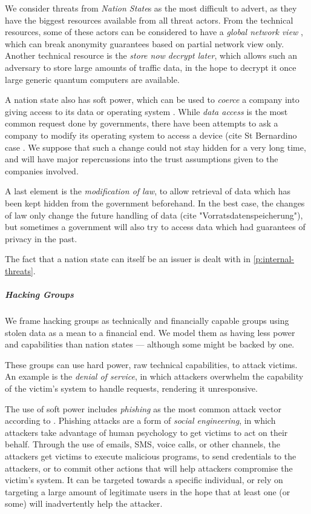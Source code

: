 We consider threats from \emph{Nation State}s as the most difficult to advert, as they have
the biggest resources available from all threat actors.
From the technical resources, some of these actors can be considered to have a \emph{global network view}
\cite{TorAttack}, which can break anonymity guarantees based on partial network view only.
Another technical resource is the \emph{store now decrypt later}, which allows such an adversary
to store large amounts of traffic data, in the hope to decrypt it once large generic quantum computers
are available.

A nation state also has soft power, which can be used to \emph{coerce} a company into giving
access to its data or operating system \cite{TelegramArrest}\cite{ProtonLogging}.
While \emph{data access} is the most common request done by governments, there have been attempts
to ask a company to modify its operating system to access a device (cite St Bernardino case
\cite{AppleSanBernardino}.
We suppose that such a change could not stay hidden for a very long time, and will have major
repercussions into the trust assumptions given to the companies involved.

A last element is the \emph{modification of law}, to allow retrieval of data which has been
kept hidden from the government beforehand.
In the best case, the changes of law only change the future handling of data (cite
"Vorratsdatenspeicherung"), but sometimes a government will also try to access
data which had guarantees of privacy in the past.

The fact that a nation state can itself be an issuer is dealt with in \ref{p:internal-threats}.

\subparagraph{Hacking Groups}

We frame hacking groups as technically and financially capable groups using stolen data as a mean to a financial end.
We model them as having less power and capabilities than nation states --- although some might be backed by one.

These groups can use hard power, raw technical capabilities, to attack victims. 
An example is the \emph{denial of service}, in which attackers
overwhelm the capability of the victim's system to handle requests, rendering it unresponsive.

The use of soft power includes \emph{phishing} as the most common attack vector according to \cite{IC3-24}.
Phishing attacks are a form of \emph{social engineering}, in which attackers take advantage of human psychology to get victims to act on their behalf.
Through the use of emails, SMS, voice calls, or other channels, the attackers get victims to execute malicious programs, to send credentials to the attackers, or to commit other actions that will help attackers compromise the victim's system.
It can be targeted towards a specific individual, or rely on targeting a large amount of legitimate users in the hope that at least one (or some) will inadvertently help the attacker.

